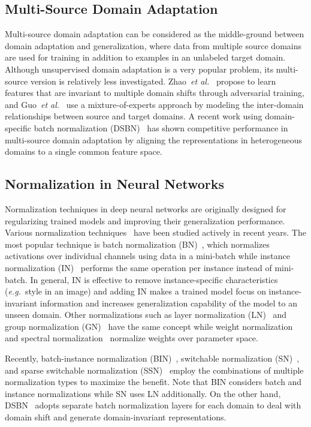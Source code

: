 \documentclass[runningheads]{llncs}
\newcommand\etal{\textit{et al.}}
\newcommand\eg{\textit{e.g.}}
\begin{document}
\subsection{Multi-Source Domain Adaptation}
Multi-source domain adaptation can be considered as the middle-ground between domain adaptation and generalization, where data from multiple source domains are used for training in addition to examples in an unlabeled target domain. 
Although unsupervised domain adaptation is a very popular problem, its multi-source version is relatively less investigated. 
Zhao~\etal~\cite{zhao2018adversarial} propose to learn features that are invariant to multiple domain shifts through adversarial training, and Guo~\etal~\cite{guo2018multi} use a mixture-of-experts approach by modeling the inter-domain relationships between source and target domains.
A recent work using domain-specific batch normalization (DSBN)~\cite{dsbn} has shown competitive performance in multi-source domain adaptation by aligning the representations in heterogeneous domains to a single common feature space.


\subsection{Normalization in Neural Networks}
Normalization techniques in deep neural networks are originally designed for regularizing trained models and improving their generalization performance.
Various normalization techniques~\cite{bn,in,ln,spectralnorm,wn,gn,bin,sn,ssn,dsbn} have been studied actively in recent years. 
The most popular technique is batch normalization (BN)~\cite{bn}, which normalizes activations over individual channels using data in a mini-batch while instance normalization (IN)~\cite{in} performs the same operation per instance instead of mini-batch.
In general, IN is effective to remove instance-specific characteristics (\eg~style in an image) and adding IN makes a trained model focus on instance-invariant information and increases generalization capability of the model to an unseen domain.
Other normalizations such as layer normalization (LN)~\cite{ln} and group normalization (GN)~\cite{gn} have the same concept while weight normalization~\cite{wn} and spectral normalization~\cite{spectralnorm} normalize weights over parameter space. 

Recently, batch-instance normalization (BIN)~\cite{bin}, switchable normalization (SN)~\cite{sn}, and sparse switchable normalization (SSN)~\cite{ssn} employ the combinations of multiple normalization types to maximize the benefit.
Note that BIN considers batch and instance normalizations while SN uses LN additionally.
On the other hand, DSBN~\cite{dsbn} adopts separate batch normalization layers for each domain to deal with domain shift and generate domain-invariant representations.
 
\end{document}
